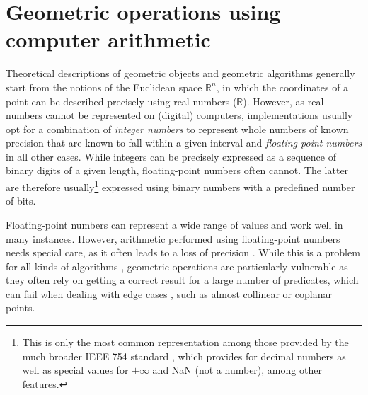 \section{Geometric operations using computer arithmetic}
\label{se:computerarithmetic}

Theoretical descriptions of geometric objects and geometric algorithms generally start from the notions of the Euclidean space $\mathbb{R}^n$, in which the coordinates of a point can be described precisely using real numbers ($\mathbb{R}$).
However, as real numbers cannot be represented on (digital) computers, implementations usually opt for a combination of \emph{integer numbers} to represent whole numbers of known precision that are known to fall within a given interval and \emph{floating-point numbers} in all other cases.
While integers can be precisely expressed as a sequence of binary digits of a given length, floating-point numbers often cannot.
The latter are therefore usually\footnote{This is only the most common representation among those provided by the much broader IEEE 754 standard \citep{IEEE754-2008}, which provides for decimal numbers as well as special values for $\pm \infty$ and NaN (not a number), among other features.} expressed using binary numbers with a predefined number of bits.



Floating-point numbers can represent a wide range of values and work well in many instances.
However, arithmetic performed using floating-point numbers needs special care, as it often leads to a loss of precision \citep{Goldberg91}.
While this is a problem for all kinds of algorithms \citep{Hoffmann88}, geometric operations are particularly vulnerable as they often rely on getting a correct result for a large number of predicates, which can fail when dealing with edge cases \citep{Kettner08}, such as almost collinear or coplanar points.

